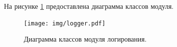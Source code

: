 

На рисунке \ref{fig:loggingUml} предоставлена диаграмма классов модуля.
\begin{figure}[H]
	\centering
	\texttt{[image: img/logger.pdf]}
	\caption{Диаграмма классов модуля логирования.}
	\label{fig:loggingUml}
\end{figure}


